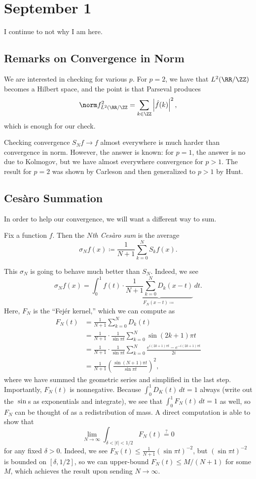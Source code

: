\documentclass[../notes.tex]{subfiles}
\begin{document}
\section{September 1}

I continue to not why I am here.

\subsection{Remarks on Convergence in Norm}
We are interested in checking  for various $p$. For $p=2$, we have that $L^2(\RR/\ZZ)$ becomes a Hilbert space, and the point is that Parseval produces
\[\norm f_{L^2(\RR/\ZZ}^2=\sum_{k\in\ZZ}\left|\hat f(k)\right|^2,\]
which is enough for our check.
\begin{remark}
	Checking convergence $S_Nf\to f$ almost everywhere is much harder than convergence in norm. However, the answer is known: for $p=1$, the answer is no due to Kolmogov, but we have almost everywhere convergence for $p>1$. The result for $p=2$ was shown by Carleson and then generalized to $p>1$ by Hunt.
\end{remark}

\subsection{Ces\`aro Summation}
In order to help our convergence, we will want a different way to sum.
\begin{definition}
	Fix a function $f$. Then the \textit{$N$th Ces\`aro sum} is the average
	\[\sigma_Nf(x)\coloneqq\frac1{N+1}\sum_{k=0}^NS_kf(x).\]
\end{definition}
This $\sigma_N$ is going to behave much better than $S_N$. Indeed, we see
\[\sigma_Nf(x) = \int_0^1f(t)\cdot\underbrace{\frac1{N+1}\sum_{k=0}^ND_k(x-t)}_{F_N(x-t)\coloneqq}\,dt.\]
Here, $F_N$ is the ``Fej\'er kernel,'' which we can compute as
\begin{align*}
	F_N(t) &= \frac1{N+1}\sum_{k=0}^ND_k(t) \\
	&= \frac1{N+1}\cdot\frac1{\sin\pi t}\sum_{k=0}^N\sin(2k+1)\pi t \\
	&= \frac1{N+1}\cdot\frac1{\sin\pi t}\sum_{k=0}^N\frac{e^{i(2k+1)\pi t}-e^{-i(2k+1)\pi t}}{2i} \\
	&= \frac1{N+1}\left(\frac{\sin(N+1)\pi t}{\sin\pi t}\right)^2,
\end{align*}
where we have summed the geometric series and simplified in the last step. Importantly, $F_N(t)$ is nonnegative. Because $\int_0^1D_K(t)\,dt=1$ always (write out the $\sin$s as exponentials and integrate), we see that $\int_0^1F_N(t)\,dt=1$ as well, so $F_N$ can be thought of as a redistribution of mass. A direct computation is able to show that
\begin{equation}
	\lim_{N\to\infty}\int_{\delta<\left|t\right|<1/2}F_N(t)\stackrel?=0 \label{eq:fejer-kernel-small}
\end{equation}
for any fixed $\delta>0$. Indeed, we see $F_N(t)\le\frac1{N+1}(\sin\pi t)^{-2}$, but $(\sin\pi t)^{-2}$ is bounded on $[\delta,1/2]$, so we can upper-bound $F_N(t)\le M/(N+1)$ for some $M$, which achieves the result upon sending $N\to\infty$.
\end{document}

